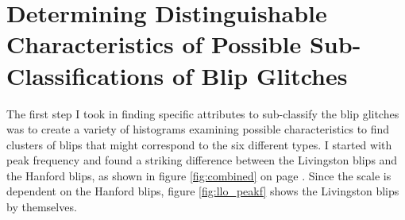 \documentclass[a4paper]{article}
\begin{document}
\section{Determining Distinguishable Characteristics of Possible Sub-Classifications of Blip Glitches}

The first step I took in finding specific attributes to sub-classify the blip glitches was to create a variety of histograms examining possible characteristics to find clusters of blips that might correspond to the six different types. I started with peak frequency and found a striking difference between the Livingston blips and the Hanford blips, as shown in figure \ref{fig:combined} on page \pageref{fig:combined_peakf}. Since the scale is dependent on the Hanford blips, figure \ref{fig:llo_peakf} shows the Livingston blips by themselves.
\end{document}
